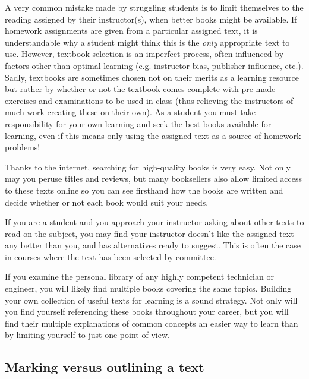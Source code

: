 A very common mistake made by struggling students is to limit themselves to the reading assigned by their instructor(s), when better books might be available.  If homework assignments are given from a particular assigned text, it is understandable why a student might think this is the \textit{only} appropriate text to use.  However, textbook selection is an imperfect process, often influenced by factors other than optimal learning (e.g. instructor bias, publisher influence, etc.).  Sadly, textbooks are sometimes chosen not on their merits as a learning resource but rather by whether or not the textbook comes complete with pre-made exercises and examinations to be used in class (thus relieving the instructors of much work creating these on their own).  As a student you must take responsibility for your own learning and seek the best books available for learning, even if this means only using the assigned text as a source of homework problems!

\vskip 10pt

Thanks to the internet, searching for high-quality books is very easy.  Not only may you peruse titles and reviews, but many booksellers also allow limited access to these texts online so you can see firsthand how the books are written and decide whether or not each book would suit your needs.

If you are a student and you approach your instructor asking about other texts to read on the subject, you may find your instructor doesn't like the assigned text any better than you, and has alternatives ready to suggest.  This is often the case in courses where the text has been selected by committee.

\vskip 10pt

If you examine the personal library of any highly competent technician or engineer, you will likely find multiple books covering the same topics.  Building your own collection of useful texts for learning is a sound strategy.  Not only will you find yourself referencing these books throughout your career, but you will find their multiple explanations of common concepts an easier way to learn than by limiting yourself to just one point of view.









\filbreak
\subsection{Marking versus outlining a text}

